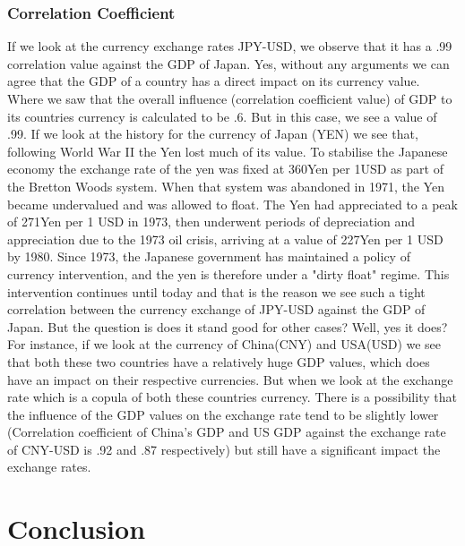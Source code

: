 \subsubsection{Correlation Coefficient}
If we look at the currency exchange rates JPY-USD, we observe that it has a .99 correlation value against the GDP of Japan. Yes, without any arguments we can agree that the GDP of a country has a direct impact on its currency value. Where we saw that the overall influence (correlation coefficient value) of GDP to its countries currency is calculated to be .6. But in this case, we see a value of .99.
\newline
If we look at the history for the currency of Japan (YEN) we see that, following World War II the Yen lost much of its value. To stabilise the Japanese economy the exchange rate of the yen was fixed at 360Yen per 1USD as part of the Bretton Woods system. When that system was abandoned in 1971, the Yen became undervalued and was allowed to float. The Yen had appreciated to a peak of 271Yen per 1 USD in 1973, then underwent periods of depreciation and appreciation due to the 1973 oil crisis, arriving at a value of 227Yen per 1 USD by 1980. Since 1973, the Japanese government has maintained a policy of currency intervention, and the yen is therefore under a "dirty float" regime. This intervention continues until today and that is the reason we see such a tight correlation between the currency exchange of JPY-USD against the GDP of Japan.\newline
But the question is does it stand good for other cases? Well, yes it does? For instance, if we look at the currency of China(CNY) and USA(USD) we see that both these two countries have a relatively huge GDP values, which does have an impact on their respective currencies. But when we look at the exchange rate which is a copula of both these countries currency. There is a possibility that the influence of the GDP values on the exchange rate tend to be slightly lower (Correlation coefficient of China's GDP and US GDP against the exchange rate of CNY-USD is .92 and .87 respectively) but still have a significant impact the exchange rates. 

\section{Conclusion}



     







